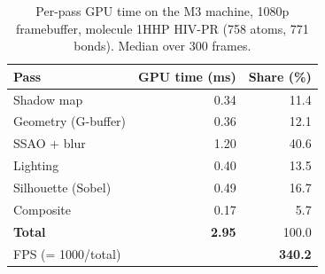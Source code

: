 \begin{table}[H]
    \centering
    \small
    \begin{tabular}{lrr}
        \toprule
        Pass & GPU time (ms) & Share (\%) \\
        \midrule
        Shadow map & 0.34 & 11.4 \\
        Geometry (G-buffer) & 0.36 & 12.1 \\
        SSAO + blur & 1.20 & 40.6 \\
        Lighting & 0.40 & 13.5 \\
        Silhouette (Sobel) & 0.49 & 16.7 \\
        Composite & 0.17 & 5.7 \\
        \midrule
        \textbf{Total} & \textbf{2.95} & 100.0 \\
        FPS (= 1000/total) & \multicolumn{2}{r}{\textbf{340.2}} \\
        \bottomrule
    \end{tabular}
    \caption{Per-pass GPU time on the M3 machine, 1080p framebuffer, molecule 1HHP HIV-PR (758 atoms, 771 bonds). Median over 300 frames.}
    \label{tab:perpass_m3}
\end{table}
